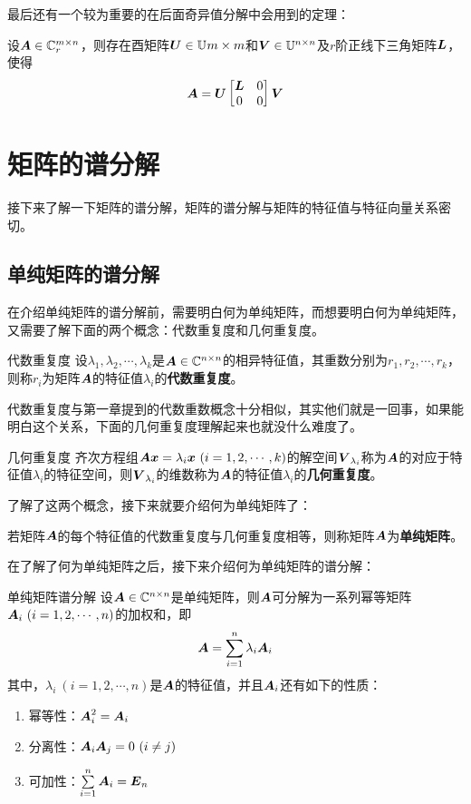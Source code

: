 \documentclass[12pt, a4paper, oneside, UTF8]{ctexbook}
\begin{document}
最后还有一个较为重要的在后面奇异值分解中会用到的定理：
\begin{them}{}{}
    设$\boldsymbol{A}\in\mathbb{C}^{m\times n}_r$，则存在酉矩阵$\boldsymbol{U}\in\mathbb{U}^{}m\times m$和$\boldsymbol{V}\in\mathbb{U}^{n\times n}$及$r$阶正线下三角矩阵$\boldsymbol{L}$，使得\[\boldsymbol{A}=\boldsymbol{U}\begin{bmatrix}
        \boldsymbol{L}&0\\0&0
    \end{bmatrix}\boldsymbol{V}\]
\end{them}

\section{矩阵的谱分解}
接下来了解一下矩阵的谱分解，矩阵的谱分解与矩阵的特征值与特征向量关系密切。
\subsection{单纯矩阵的谱分解}
在介绍单纯矩阵的谱分解前，需要明白何为单纯矩阵，而想要明白何为单纯矩阵，又需要了解下面的两个概念：代数重复度和几何重复度。
\begin{defn}{代数重复度}{}
设$\lambda_1,\lambda_2,\cdots,\lambda_k$是$\boldsymbol{A}\in\mathbb{C}^{n\times n}$的相异特征值，其重数分别为$r_1,r_2,\cdots,r_k$，则称$r_i$为矩阵$\boldsymbol{A}$的特征值$\lambda_i$的\textbf{代数重复度}。
\end{defn}
代数重复度与第一章提到的代数重数概念十分相似，其实他们就是一回事，如果能明白这个关系，下面的几何重复度理解起来也就没什么难度了。
\begin{defn}{几何重复度}{}
    齐次方程组$\A\x=\lambda_i\x\ (i=1,2,\cdots,k)$的解空间$\boldsymbol{V}_{\lambda_i}$称为$\boldsymbol{A}$的对应于特征值$\lambda_i$的特征空间，则$\boldsymbol{V}_{\lambda_i}$的维数称为$\boldsymbol{A}$的特征值$\lambda_i$的\textbf{几何重复度}。
\end{defn}
了解了这两个概念，接下来就要介绍何为单纯矩阵了：
\begin{defn}{}{}
    若矩阵$\boldsymbol{A}$的每个特征值的代数重复度与几何重复度相等，则称矩阵$\boldsymbol{A}$为\textbf{单纯矩阵}。
\end{defn}

在了解了何为单纯矩阵之后，接下来介绍何为单纯矩阵的谱分解：
\begin{them}{单纯矩阵谱分解}{}
    设$\boldsymbol{A}\in\mathbb{C}^{n\times n}$是单纯矩阵，则$\boldsymbol{A}$可分解为一系列幂等矩阵$\boldsymbol{A}_i\ (i=1,2,\cdots,n)$的加权和，即\[\boldsymbol{A}=\sum_{i=1}^{n}\lambda_i\boldsymbol{A}_i\]其中，$\lambda_i\ (i=1,2,\cdots,n)$是$\boldsymbol{A}$的特征值，并且$\boldsymbol{A}_i$还有如下的性质：
    \begin{enumerate}
        \item 幂等性：$\boldsymbol{A}_i^2=\boldsymbol{A}_i$
        \item 分离性：$\boldsymbol{A}_i\boldsymbol{A}_j=0\ (i\neq j)$
        \item 可加性：$\sum\limits_{i=1}^n\boldsymbol{A}_i=\boldsymbol{E}_n$
    \end{enumerate}
\end{them}
\end{document}
